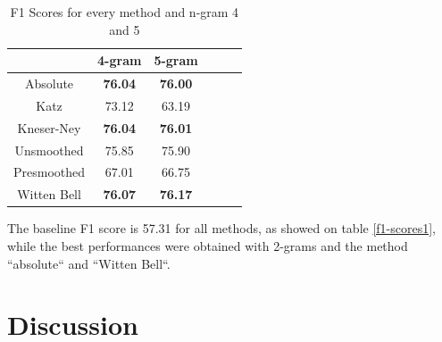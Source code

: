 \documentclass[11pt,a4paper]{article}
\begin{document}
\begin{table}[t!]
\begin{center}
\begin{tabular}{|c|c|c|c|c|c|}
\hline
& 4-gram & 5-gram \\ \hline
Absolute & \textbf{76.04} & \textbf{76.00} \\ \hline
Katz & 73.12 & 63.19 \\ \hline
Kneser-Ney & \textbf{76.04} & \textbf{76.01} \\ \hline
Unsmoothed & 75.85 & 75.90 \\ \hline
Presmoothed & 67.01 & 66.75 \\ \hline
Witten Bell & \textbf{76.07} & \textbf{76.17} \\ \hline
\end{tabular}
\caption{F1 Scores for every method and n-gram 4 and 5}
\label{f1-scores2}
\end{center}
\end{table}

 The baseline F1 score is 57.31 for all methods, as showed on table \ref{f1-scores1}, while the best performances were obtained with 2-grams and the method ``absolute`` and ``Witten Bell``.
\section{Discussion}
\end{document}
